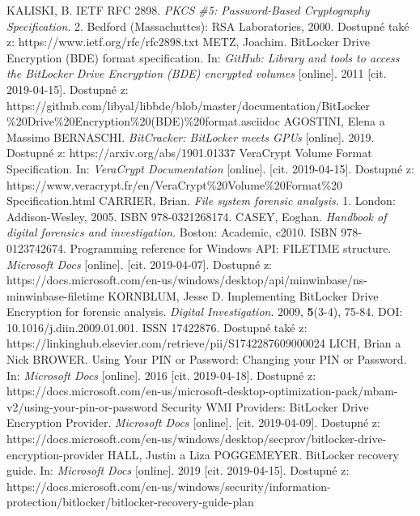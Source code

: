 \documentclass[a4paper,12pt]{article}
\begin{document}
{
KALISKI, B. IETF RFC 2898. \textit{PKCS \#5: Password-Based Cryptography Specification}. 2. Bedford (Massachuttes): RSA Laboratories, 2000. Dostupné také z: https://www.ietf.org/rfc/rfc2898.txt
METZ, Joachim. BitLocker Drive Encryption (BDE) format specification. In: \textit{GitHub: Library and tools to access the BitLocker Drive Encryption (BDE) encrypted volumes} [online]. 2011 [cit. 2019-04-15]. Dostupné z: https://github.com/libyal/libbde/blob/master/documentation/BitLocker\\\%20Drive\%20Encryption\%20(BDE)\%20format.asciidoc
AGOSTINI, Elena a Massimo BERNASCHI. \textit{BitCracker: BitLocker meets GPUs} [online]. 2019. Dostupné z: https://arxiv.org/abs/1901.01337
VeraCrypt Volume Format Specification. In: \textit{VeraCrypt Documentation} [online]. [cit. 2019-04-15]. Dostupné z: https://www.veracrypt.fr/en/VeraCrypt\%20Volume\%20Format\%20\\Specification.html
CARRIER, Brian. \textit{File system forensic analysis}. 1. London: Addison-Wesley, 2005. ISBN 978-0321268174.
CASEY, Eoghan. \textit{Handbook of digital forensics and investigation}. Boston: Academic, c2010. ISBN 978-0123742674.
Programming reference for Windows API: FILETIME structure. \textit{Microsoft Docs} [online]. [cit. 2019-04-07]. Dostupné z: https://docs.microsoft.com/en-us/windows/desktop/api/minwinbase/ns-minwinbase-filetime
KORNBLUM, Jesse D. Implementing BitLocker Drive Encryption for forensic analysis. \textit{Digital Investigation}. 2009, \textbf{5}(3-4), 75-84. DOI: 10.1016/j.diin.2009.01.001. ISSN 17422876. Dostupné také z: https://linkinghub.elsevier.com/retrieve/pii/S1742287609000024
LICH, Brian a Nick BROWER. Using Your PIN or Password: Changing your PIN or Password. In: \textit{Microsoft Docs} [online]. 2016 [cit. 2019-04-18]. Dostupné z: https://docs.microsoft.com/en-us/microsoft-desktop-optimization-pack/mbam-v2/using-your-pin-or-password
Security WMI Providers: BitLocker Drive Encryption Provider. \textit{Microsoft Docs} [online]. [cit. 2019-04-09]. Dostupné z: https://docs.microsoft.com/en-us/windows/desktop/secprov/bitlocker-drive-encryption-provider
HALL, Justin a Liza POGGEMEYER. BitLocker recovery guide. In: \textit{Microsoft Docs} [online]. 2019 [cit. 2019-04-15]. Dostupné z: https://docs.microsoft.com/en-us/windows/security/information-protection/bitlocker/bitlocker-recovery-guide-plan
}
\end{document}
